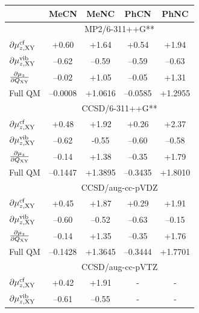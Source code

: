 \documentclass[b5paper,oneside,fleqn,11pt]{book}
\newcommand{\fderiv}[2]{\ensuremath{
    \frac{\partial #1}{\partial #2}}}
\begin{document}
\begin{refsection}
\begin{table}[t!]
\begin{tabular*}{1.0\textwidth}{@{\extracolsep{\fill} } l cccc}
\hline\hline
                                          & MeCN      & MeNC     & PhCN     & PhNC     \\
\hline
%
& \multicolumn{4}{c}{MP2/6-311++G**}                                                   \\
$\partial\mu_{z,{\rm XY}}^{\rm cf}$       &   +0.60   &   +1.64  &   +0.54  &   +1.94  \\
$\partial\mu_{z,{\rm XY}}^{\rm vib}$      &  --0.62   &  --0.59  &  --0.59  &  --0.63  \\
$\fderiv{\mu_z}{Q_{\rm XY}}$              &  --0.02   &   +1.05  &  --0.05  &   +1.31  \\
Full QM                                   &  --0.0008 &  +1.0616 & --0.0585 & +1.2955  \\
%
& \multicolumn{4}{c}{CCSD/6-311++G**}                                                  \\
$\partial\mu_{z,{\rm XY}}^{\rm cf}$       &   +0.48   &   +1.92  &   +0.26  &  +2.37   \\
$\partial\mu_{z,{\rm XY}}^{\rm vib}$      &  --0.62   &   -0.55  &  --0.60  & --0.58   \\
$\fderiv{\mu_z}{Q_{\rm XY}}$              &  --0.14   &   +1.38  &  --0.35  &  +1.79   \\
Full QM                                   &  --0.1447 &  +1.3895 & --0.3435 & +1.8010  \\
%
& \multicolumn{4}{c}{CCSD/aug-cc-pVDZ}                                                 \\
$\partial\mu_{z,{\rm XY}}^{\rm cf}$       &   +0.45   &   +1.87  &   +0.29  &  +1.91   \\
$\partial\mu_{z,{\rm XY}}^{\rm vib}$      &  --0.60   &  --0.52  &  --0.63  & --0.15   \\
$\fderiv{\mu_z}{Q_{\rm XY}}$              &  --0.14   &   +1.35  &  --0.35  &  +1.76   \\
Full QM                                   &  --0.1428 &  +1.3645 & --0.3444 & +1.7701  \\
%
& \multicolumn{4}{c}{CCSD/aug-cc-pVTZ}                                                 \\
$\partial\mu_{z,{\rm XY}}^{\rm cf}$       &   +0.42   &   +1.91  &    -     &  -       \\
$\partial\mu_{z,{\rm XY}}^{\rm vib}$      &  --0.61   &  --0.55  &    -     &  -       \\

\end{tabular*}
\end{table}
\end{refsection}
\end{document}

